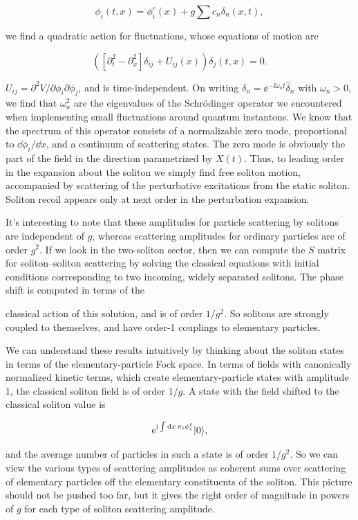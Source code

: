 \[
  \phi_i(t,x)=\phi_i^c(x)+g\sum c_n\delta_n(x,t),
\]

we find a quadratic action for fluctuations, whose equations of motion are

\[
  \left([\partial_t^2-\partial_x^2]\delta_{ij}+U_{ij}(x)\right)
  \delta_j(t,x)=0.
\]

$U_{ij}=\partial^2V/\partial\phi_i\partial\phi_j$, and is time-independent.
On writing $\delta_n=\ee^{-\ii\omega_nt}\hat\delta_n$ with $\omega_n>0$, we find that
$\omega_n^2$ are the eigenvalues of the Schrödinger operator we encountered
when implementing small fluctuations around quantum instantons. We know that
the spectrum of this operator consists of a normalizable zero mode, proportional
to $\dd\phi_i/\dd x$, and a continuum of scattering states. The zero mode is
obviously the part of the field in the direction parametrized by $X(t)$. Thus,
to leading order in the expansion about the soliton we simply find free soliton
motion, accompanied by scattering of the perturbative excitations from the static
soliton. Soliton recoil appears only at next order in the perturbation expansion.

It's interesting to note that these amplitudes for particle scattering by solitons
are independent of $g$, whereas scattering amplitudes for ordinary particles are
of order $g^2$. If we look in the two-soliton sector, then we can compute the
$S$ matrix for soliton--soliton scattering by solving the classical equations
with initial conditions corresponding to two incoming, widely separated
solitons. The phase shift is computed in terms of the

classical action of this solution, and is of order $1/g^2$. So solitons are
strongly coupled to themselves, and have order-1 couplings to elementary
particles.

We can understand these results intuitively by thinking about the soliton states
in terms of the elementary-particle Fock space. In terms of fields with
canonically normalized kinetic terms, which create elementary-particle states
with amplitude 1, the classical soliton field is of order $1/g$. A state with the
field shifted to the classical soliton value is

\[
  \mathrm{e}^{\mathrm{i}\int\mathop{}\!\mathrm{d} x\,\pi_i\phi_i^c}\lvert 0\rangle,
\]

and the average number of particles in such a state is of order $1/g^2$. So we
can view the various types of scattering amplitudes as coherent sums over
scattering of elementary particles off the elementary constituents of the
soliton. This picture should not be pushed too far, but it gives the right order
of magnitude in powers of $g$ for each type of soliton scattering amplitude.

